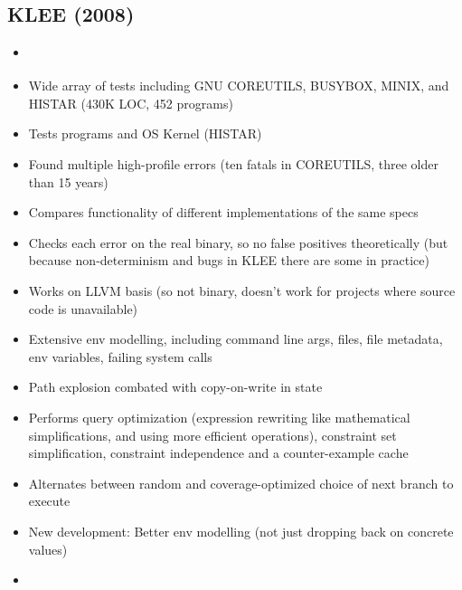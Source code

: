 \documentclass{article}
\begin{document}
\subsection{KLEE (2008)}
\begin{itemize}
    \item \cite{KLEE}
    \item Wide array of tests including GNU COREUTILS, BUSYBOX, MINIX, and HISTAR (430K LOC, 452 programs)
    \item Tests programs and OS Kernel (HISTAR)
    \item Found multiple high-profile errors (ten fatals in COREUTILS, three older than 15 years)
    \item Compares functionality of different implementations of the same specs
    \item Checks each error on the real binary, so no false positives theoretically (but because non-determinism and bugs in KLEE there are some in practice)
    \item Works on LLVM basis (so not binary, doesn't work for projects where source code is unavailable)
    \item Extensive env modelling, including command line args, files, file metadata, env variables, failing system calls
    \item Path explosion combated with copy-on-write in state
    \item Performs query optimization (expression rewriting like mathematical simplifications, and using more efficient operations), constraint set simplification, constraint independence and a counter-example cache
    \item Alternates between random and coverage-optimized choice of next branch to execute
    \item New development: Better env modelling (not just dropping back on concrete values)
    \item {}\cite{Science}
\end{itemize}
\end{document}
